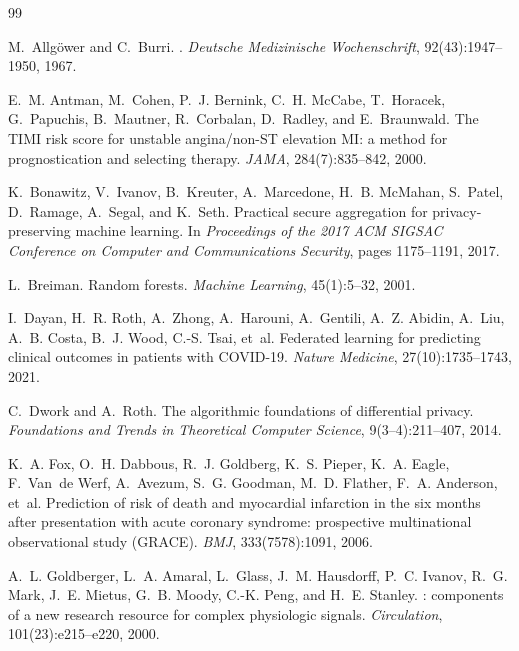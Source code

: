 \documentclass[12pt,a4paper,oneside]{report}
\begin{document}
\begin{thebibliography}{99}

M.~Allg{\"o}wer and C.~Burri.
.
\newblock \emph{Deutsche Medizinische Wochenschrift}, 92(43):1947--1950, 1967.

E.~M. Antman, M.~Cohen, P.~J. Bernink, C.~H. McCabe, T.~Horacek, G.~Papuchis,
  B.~Mautner, R.~Corbalan, D.~Radley, and E.~Braunwald.
\newblock The {TIMI} risk score for unstable angina/non-{ST} elevation {MI}: a
  method for prognostication and selecting therapy.
\newblock \emph{JAMA}, 284(7):835--842, 2000.

K.~Bonawitz, V.~Ivanov, B.~Kreuter, A.~Marcedone, H.~B. McMahan, S.~Patel,
  D.~Ramage, A.~Segal, and K.~Seth.
\newblock Practical secure aggregation for privacy-preserving machine learning.
\newblock In \emph{Proceedings of the 2017 ACM SIGSAC Conference on Computer
  and Communications Security}, pages 1175--1191, 2017.

L.~Breiman.
\newblock Random forests.
\newblock \emph{Machine Learning}, 45(1):5--32, 2001.

I.~Dayan, H.~R. Roth, A.~Zhong, A.~Harouni, A.~Gentili, A.~Z. Abidin, A.~Liu,
  A.~B. Costa, B.~J. Wood, C.-S. Tsai, et~al.
\newblock Federated learning for predicting clinical outcomes in patients with
  {COVID-19}.
\newblock \emph{Nature Medicine}, 27(10):1735--1743, 2021.

C.~Dwork and A.~Roth.
\newblock The algorithmic foundations of differential privacy.
\newblock \emph{Foundations and Trends{\textregistered} in Theoretical
  Computer Science}, 9(3--4):211--407, 2014.

K.~A. Fox, O.~H. Dabbous, R.~J. Goldberg, K.~S. Pieper, K.~A. Eagle, F.~Van~de
  Werf, A.~Avezum, S.~G. Goodman, M.~D. Flather, F.~A. Anderson, et~al.
\newblock Prediction of risk of death and myocardial infarction in the six
  months after presentation with acute coronary syndrome: prospective
  multinational observational study ({GRACE}).
\newblock \emph{BMJ}, 333(7578):1091, 2006.

A.~L. Goldberger, L.~A. Amaral, L.~Glass, J.~M. Hausdorff, P.~C. Ivanov, R.~G.
  Mark, J.~E. Mietus, G.~B. Moody, C.-K. Peng, and H.~E. Stanley.
: components of a new
  research resource for complex physiologic signals.
\newblock \emph{Circulation}, 101(23):e215--e220, 2000.


\end{thebibliography}
\end{document}
